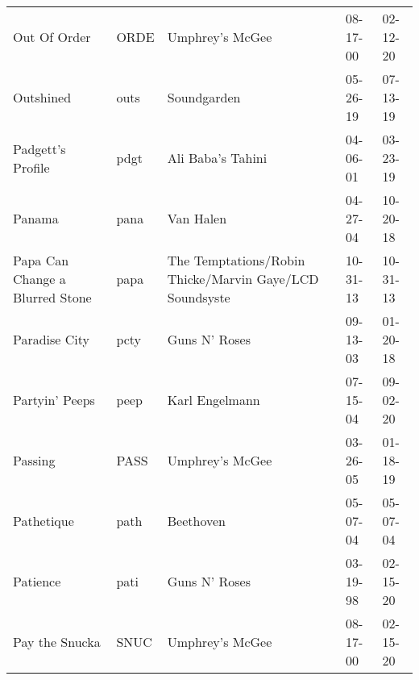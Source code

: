 \begin{longtable}{p{}p{}p{}p{}p{}}
                                                            Out Of Order &          ORDE &                                          Umphrey's McGee &              08-17-00 &             02-12-20 \\
                                                               Outshined &          outs &                                              Soundgarden &              05-26-19 &             07-13-19 \\
                                                       Padgett's Profile &          pdgt &                                        Ali Baba's Tahini &              04-06-01 &             03-23-19 \\
                                                                  Panama &          pana &                                                Van Halen &              04-27-04 &             10-20-18 \\
                                         Papa Can Change a Blurred Stone &          papa &  The Temptations/Robin Thicke/Marvin Gaye/LCD Soundsyste &              10-31-13 &             10-31-13 \\
                                                           Paradise City &          pcty &                                            Guns N' Roses &              09-13-03 &             01-20-18 \\
                                                          Partyin' Peeps &          peep &                                           Karl Engelmann &              07-15-04 &             09-02-20 \\
                                                                 Passing &          PASS &                                          Umphrey's McGee &              03-26-05 &             01-18-19 \\
                                                              Pathetique &          path &                                                Beethoven &              05-07-04 &             05-07-04 \\
                                                                Patience &          pati &                                            Guns N' Roses &              03-19-98 &             02-15-20 \\
                                                          Pay the Snucka &          SNUC &                                          Umphrey's McGee &              08-17-00 &             02-15-20 \\

\end{longtable}
